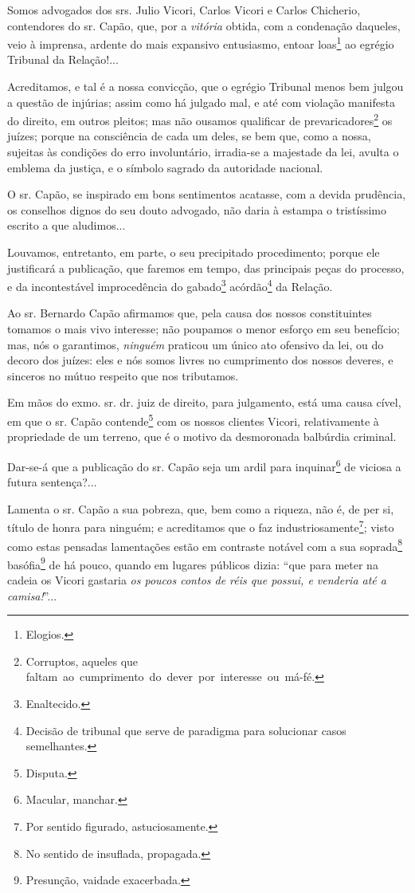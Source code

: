 Somos advogados dos srs. Julio Vicori, Carlos Vicori e Carlos Chicherio,
contendores do sr. Capão, que, por a \emph{vitória} obtida, com a
condenação daqueles, veio à imprensa, ardente do mais expansivo
entusiasmo, entoar loas\footnote{Elogios.} ao egrégio Tribunal da
Relação!...

Acreditamos, e tal é a nossa convicção, que o egrégio Tribunal menos bem
julgou a questão de injúrias; assim como há julgado mal, e até com
violação manifesta do direito, em outros pleitos; mas não ousamos
qualificar de prevaricadores\footnote{Corruptos, aqueles que
  faltam~ao~cumprimento~do~dever~por~interesse~ou~má-fé.} os juízes;
porque na consciência de cada um deles, se bem que, como a nossa,
sujeitas às condições do erro involuntário, irradia-se a majestade da
lei, avulta o emblema da justiça, e o símbolo sagrado da autoridade
nacional.

O sr. Capão, se inspirado em bons sentimentos acatasse, com a devida
prudência, os conselhos dignos do seu douto advogado, não daria à
estampa o tristíssimo escrito a que aludimos...

Louvamos, entretanto, em parte, o seu precipitado procedimento; porque
ele justificará a publicação, que faremos em tempo, das principais peças
do processo, e da incontestável improcedência do gabado\footnote{Enaltecido.}
acórdão\footnote{Decisão de tribunal que serve de paradigma para
  solucionar casos semelhantes.} da Relação.

Ao sr. Bernardo Capão afirmamos que, pela causa dos nossos constituintes
tomamos o mais vivo interesse; não poupamos o menor esforço em seu
benefício; mas, nós o garantimos, \emph{ninguém} praticou um único ato
ofensivo da lei, ou do decoro dos juízes: eles e nós somos livres no
cumprimento dos nossos deveres, e sinceros no mútuo respeito que nos
tributamos.

Em mãos do exmo. sr. dr. juiz de direito, para julgamento, está uma
causa cível, em que o sr. Capão contende\footnote{Disputa.} com os
nossos clientes Vicori, relativamente à propriedade de um terreno, que é
o motivo da desmoronada balbúrdia criminal.

Dar-se-á que a publicação do sr. Capão seja um ardil para
inquinar\footnote{Macular, manchar.} de viciosa a futura sentença?...

Lamenta o sr. Capão a sua pobreza, que, bem como a riqueza, não é, de
per si, título de honra para ninguém; e acreditamos que o faz
industriosamente\footnote{Por sentido figurado, astuciosamente.}; visto
como estas pensadas lamentações estão em contraste notável com a sua
soprada\footnote{No sentido de insuflada, propagada.} basófia\footnote{Presunção,
  vaidade exacerbada.} de há pouco, quando em lugares públicos dizia:
``que para meter na cadeia os Vicori gastaria \emph{os poucos contos de
réis que possui, e venderia até a camisa!}''...

